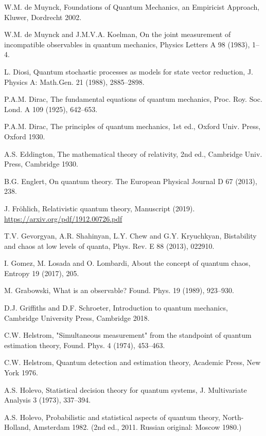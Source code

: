\documentclass[12pt]{article}
\begin{document}
\begin{thebibliography}{99}
 W.M. de Muynck,
Foundations of Quantum Mechanics, an Empiricist Approach,
Kluwer, Dordrecht 2002.

 W.M. de Muynck and J.M.V.A. Koelman,
On the joint measurement of incompatible observables in quantum
mechanics,
Physics Letters A 98 (1983), 1--4.

 L. Diosi,
Quantum stochastic processes as models for state vector reduction,
J. Physics A: Math.Gen. 21 (1988), 2885--2898.

 P.A.M. Dirac, 
The fundamental equations of quantum mechanics,
Proc. Roy. Soc. Lond. A 109 (1925), 642--653.

 P.A.M. Dirac,
The principles of quantum mechanics, 1st ed.,
Oxford Univ. Press, Oxford 1930.

 A.S. Eddington,	
The mathematical theory of relativity, 2nd ed.,
Cambridge Univ. Press, Cambridge 1930.

 B.G. Englert,
On quantum theory.
The European Physical Journal D 67 (2013), 238.

 J.  Fr\"ohlich,
Relativistic quantum theory,
Manuscript (2019).
\url{https://arxiv.org/pdf/1912.00726.pdf}

 T.V. Gevorgyan, A.R. Shahinyan, L.Y. Chew and
G.Y. Kryuchkyan,
Bistability and chaos at low levels of quanta,
Phys. Rev. E 88 (2013), 022910.

 I. Gomez, M. Losada and O. Lombardi, 
About the concept of quantum chaos,
Entropy 19 (2017), 205.

 M. Grabowski,
What is an observable?
Found. Phys. 19 (1989), 923--930.

 D.J. Griffiths and D.F. Schroeter,
Introduction to quantum mechanics,
Cambridge University Press, Cambridge 2018.

 C.W. Helstrom,
"Simultaneous measurement" from the standpoint of quantum estimation
theory,
Found. Phys. 4 (1974), 453--463.

 C.W. Helstrom,
Quantum detection and estimation theory,
Academic Press, New York 1976.

 A.S. Holevo,
Statistical decision theory for quantum systems,
J. Multivariate Analysis 3 (1973), 337--394.

 A.S. Holevo,
Probabilistic and statistical aspects of quantum theory,
North-Holland, Amsterdam 1982.
(2nd ed., 2011. Russian original: Moscow 1980.)


\end{thebibliography}
\end{document}
